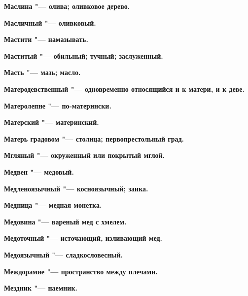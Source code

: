 \bfseries Маслина \normalfont{} "--- олива; оливковое дерево. 




\bfseries Масличный \normalfont{} "--- оливковый. 




\bfseries Мастити \normalfont{} "--- намазывать. 




\bfseries Маститый \normalfont{} "--- обильный; тучный; заслуженный. 




\bfseries Масть \normalfont{} "--- мазь; масло. 




\bfseries Матеродевственный \normalfont{} "--- одновременно относящийся и к матери, и к деве. 




\bfseries Матеролепне \normalfont{} "--- по-матерински. 




\bfseries Матерский \normalfont{} "--- материнский. 




\bfseries Матерь градовом \normalfont{} "--- столица; первопрестольный град. 




\bfseries Мгляный \normalfont{} "--- окруженный или покрытый мглой. 




\bfseries Медвен \normalfont{} "--- медовый. 




\bfseries Медленоязычный \normalfont{} "--- косноязычный; заика. 




\bfseries Медница \normalfont{} "--- медная монетка. 




\bfseries Медовина \normalfont{} "--- вареный мед с хмелем. 




\bfseries Медоточный \normalfont{} "--- источающий, изливающий мед. 




\bfseries Медоязычный \normalfont{} "--- сладкословесный. 




\bfseries Междорамие \normalfont{} "--- пространство между плечами. 




\bfseries Мездник \normalfont{} "--- наемник. 




